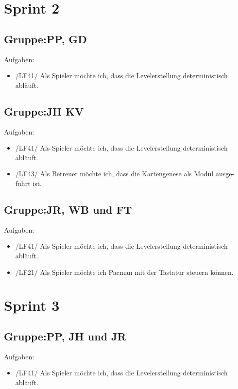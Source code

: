 \documentclass[11pt,a4paper]{article}
\begin{document}
\section*{Sprint 2}

\subsection*{Gruppe:PP, GD}
Aufgaben:
\begin{itemize}
\item /LF41/ Als Spieler möchte ich, dass die Levelerstellung deterministisch abläuft.
\end{itemize} 

\subsection*{Gruppe:JH KV}
Aufgaben:
\begin{itemize}
\item /LF41/ Als Spieler möchte ich, dass die Levelerstellung deterministisch abläuft.
\item /LF43/ Als Betreuer möchte ich, dass die Kartengenese als Modul ausge-
führt ist.
\end{itemize}

\subsection*{Gruppe:JR, WB und FT}
Aufgaben:
\begin{itemize}
\item /LF41/ Als Spieler möchte ich, dass die Levelerstellung deterministisch abläuft.
\item /LF21/ Als Spieler möchte ich Pacman mit der Tastatur steuern können. 
\end{itemize} 


\section*{Sprint 3}

\subsection*{Gruppe:PP, JH und JR}
Aufgaben:
\begin{itemize}
\item /LF41/ Als Spieler möchte ich, dass die Levelerstellung deterministisch abläuft.  
\end{itemize}
\end{document}
